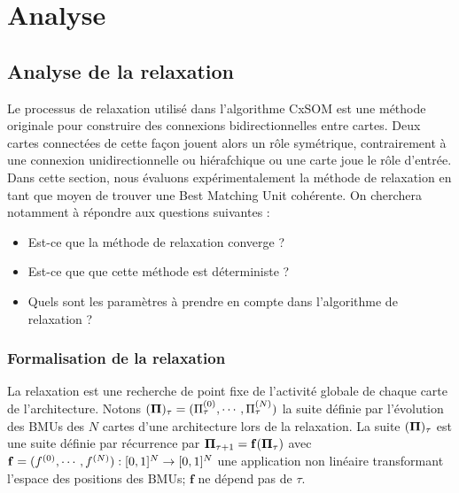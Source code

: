 \chapter{Analyse}

\section{Analyse de la relaxation}
\graphicspath{{04-Analyse/}}
\minitoc
Le processus de relaxation utilisé dans l'algorithme CxSOM est une méthode originale pour construire des connexions bidirectionnelles entre cartes. Deux cartes connectées de cette façon jouent alors un rôle symétrique, contrairement à une connexion unidirectionnelle ou hiérafchique ou une carte joue le rôle d'entrée. Dans cette section, nous évaluons expérimentalement la méthode de relaxation en tant que moyen de trouver une Best Matching Unit cohérente. On cherchera notamment à répondre aux questions suivantes :  
\begin{itemize}
\item Est-ce que la méthode de relaxation converge ?
\item Est-ce que que cette méthode est déterministe ?
\item Quels sont les paramètres à prendre en compte dans l'algorithme de relaxation ?
\end{itemize}

\subsection{Formalisation de la relaxation}

La relaxation est une recherche de point fixe de l'activité globale de chaque carte de l'architecture. Notons $(\mathbf{\Pi})_\tau = (\Pi^{({0})}_\tau,\cdots,\Pi^{({N})}_\tau)$ la suite définie par l'évolution des BMUs des $N$ cartes d'une architecture lors de la relaxation.
La suite $(\mathbf{\Pi})_\tau$ est une suite définie par récurrence par $\mathbf{\Pi}_{\tau+1} = \mathbf{f}(\mathbf{\Pi}_\tau)$
avec $\mathbf{f} = (f^{({0})},\cdots,f^{({N})}) : [0,1]^N \rightarrow [0,1]^N$ une application non linéaire transformant l'espace des positions des BMUs; $\mathbf{f}$ ne dépend pas de $\tau$.


